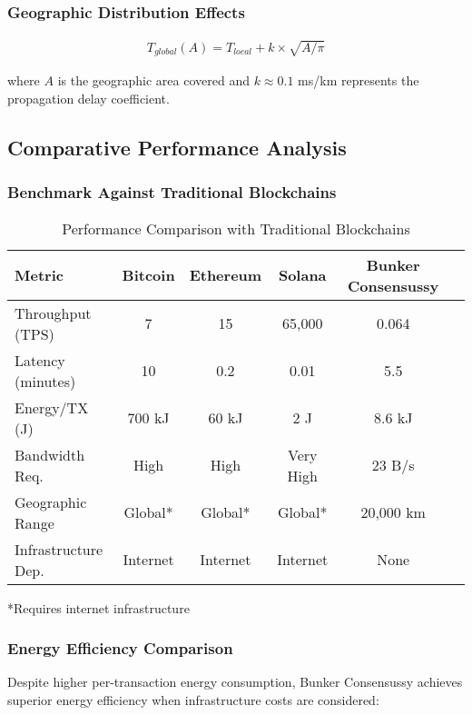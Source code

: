 \documentclass[11pt,a4paper]{article}
\begin{document}
\subsubsection{Geographic Distribution Effects}

\begin{align}
T_{global}(A) = T_{local} + k \times \sqrt{A/\pi}
\end{align}

where $A$ is the geographic area covered and $k \approx 0.1$ ms/km represents the propagation delay coefficient.

\subsection{Comparative Performance Analysis}

\subsubsection{Benchmark Against Traditional Blockchains}

\begin{table}[h]
\centering
\caption{Performance Comparison with Traditional Blockchains}
\begin{tabular}{lccccc}
\toprule
Metric & Bitcoin & Ethereum & Solana & Bunker Consensussy \\
\midrule
Throughput (TPS) & 7 & 15 & 65,000 & 0.064 \\
Latency (minutes) & 10 & 0.2 & 0.01 & 5.5 \\
Energy/TX (J) & 700 kJ & 60 kJ & 2 J & 8.6 kJ \\
Bandwidth Req. & High & High & Very High & 23 B/s \\
Geographic Range & Global* & Global* & Global* & 20,000 km \\
Infrastructure Dep. & Internet & Internet & Internet & None \\
\bottomrule
\end{tabular}
\end{table}

*Requires internet infrastructure

\subsubsection{Energy Efficiency Comparison}

Despite higher per-transaction energy consumption, Bunker Consensussy achieves superior energy efficiency when infrastructure costs are considered:
\end{document}

